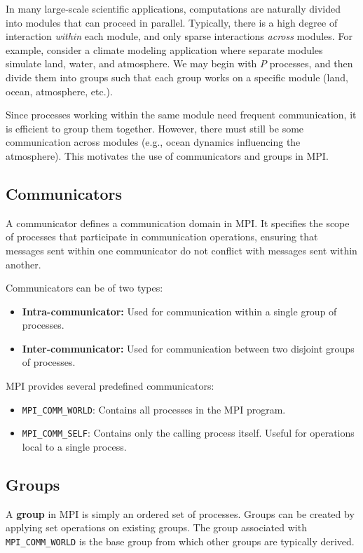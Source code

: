 \documentclass[12pt]{book}
\begin{document}
In many large-scale scientific applications, computations are naturally divided into modules that can proceed in parallel. Typically, there is a high degree of interaction \emph{within} each module, and only sparse interactions \emph{across} modules.  
For example, consider a climate modeling application where separate modules simulate land, water, and atmosphere. We may begin with $P$ processes, and then divide them into groups such that each group works on a specific module (land, ocean, atmosphere, etc.).  

Since processes working within the same module need frequent communication, it is efficient to group them together. However, there must still be some communication across modules (e.g., ocean dynamics influencing the atmosphere). This motivates the use of communicators and groups in MPI.

\subsection{Communicators}
A communicator defines a communication domain in MPI. It specifies the scope of processes that participate in communication operations, ensuring that messages sent within one communicator do not conflict with messages sent within another.  

Communicators can be of two types:
\begin{itemize}
    \item \textbf{Intra-communicator:} Used for communication within a single group of processes.
    \item \textbf{Inter-communicator:} Used for communication between two disjoint groups of processes.
\end{itemize}

MPI provides several predefined communicators:
\begin{itemize}
    \item \texttt{MPI\_COMM\_WORLD}: Contains all processes in the MPI program.
    \item \texttt{MPI\_COMM\_SELF}: Contains only the calling process itself. Useful for operations local to a single process.
\end{itemize}

\subsection{Groups}
A \textbf{group} in MPI is simply an ordered set of processes. Groups can be created by applying set operations on existing groups. The group associated with \texttt{MPI\_COMM\_WORLD} is the base group from which other groups are typically derived.  
\end{document}

